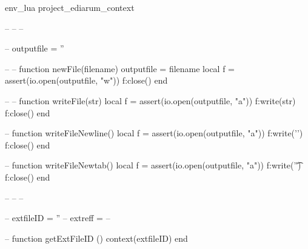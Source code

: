 \startenvironment env_lua %
\project project_ediarum_context

\startluacode
--%
--%
--%

--%
outputfile = ''

--%
--%
function newFile(filename)
	outputfile = filename
    local f = assert(io.open(outputfile, "w"))
    f:close()
end

--%
--%
function writeFile(str)
    local f = assert(io.open(outputfile, "a"))
    f:write(str)
    f:close()
end

--%
function writeFileNewline()
    local f = assert(io.open(outputfile, "a"))
    f:write('\n')
    f:close()
end

--%
function writeFileNewtab()
    local f = assert(io.open(outputfile, "a"))
    f:write('\t')
    f:close()
end

--%
--%
--%

--%
extfileID = '' --%
extreff = {} --%

--%
function getExtFileID ()
	context(extfileID)
end

